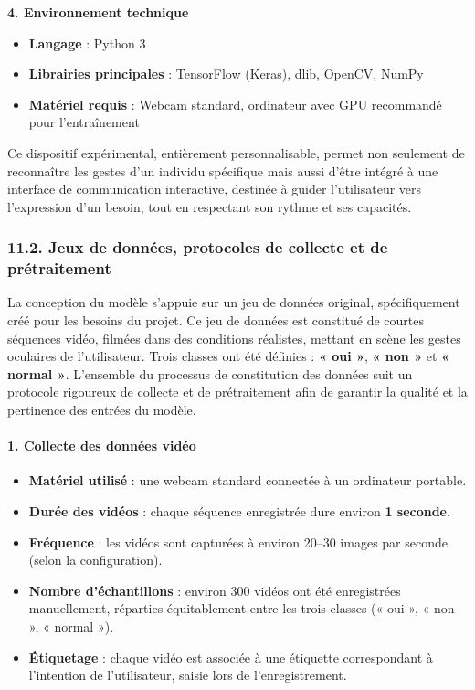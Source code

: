 \documentclass[
]{article}
\begin{document}
\textbf{4. Environnement technique}

\begin{itemize}
\item
  \textbf{Langage} : Python 3
\item
  \textbf{Librairies principales} : TensorFlow (Keras), dlib, OpenCV, NumPy
\item
  \textbf{Matériel requis} : Webcam standard, ordinateur avec GPU recommandé pour l'entraînement
\end{itemize}

Ce dispositif expérimental, entièrement personnalisable, permet non seulement de reconnaître les gestes d'un individu spécifique mais aussi d'être intégré à une interface de communication interactive, destinée à guider l'utilisateur vers l'expression d'un besoin, tout en respectant son rythme et ses capacités.

\hypertarget{jeux-de-donnuxe9es-protocoles-de-collecte-et-de-pruxe9traitement}{%
\subsubsection{11.2. Jeux de données, protocoles de collecte et de prétraitement}\label{jeux-de-donnuxe9es-protocoles-de-collecte-et-de-pruxe9traitement}}

La conception du modèle s'appuie sur un jeu de données original, spécifiquement créé pour les besoins du projet. Ce jeu de données est constitué de courtes séquences vidéo, filmées dans des conditions réalistes, mettant en scène les gestes oculaires de l'utilisateur. Trois classes ont été définies : \textbf{« oui »}, \textbf{« non »} et \textbf{« normal »}. L'ensemble du processus de constitution des données suit un protocole rigoureux de collecte et de prétraitement afin de garantir la qualité et la pertinence des entrées du modèle.

\hypertarget{collecte-des-donnuxe9es-viduxe9o}{%
\paragraph{\texorpdfstring{\textbf{1. Collecte des données vidéo}}{1. Collecte des données vidéo}}\label{collecte-des-donnuxe9es-viduxe9o}}

\begin{itemize}
\item
  \textbf{Matériel utilisé} : une webcam standard connectée à un ordinateur portable.
\item
  \textbf{Durée des vidéos} : chaque séquence enregistrée dure environ \textbf{1 seconde}.
\item
  \textbf{Fréquence} : les vidéos sont capturées à environ 20--30 images par seconde (selon la configuration).
\item
  \textbf{Nombre d'échantillons} : environ 300 vidéos ont été enregistrées manuellement, réparties équitablement entre les trois classes (« oui », « non », « normal »).
\item
  \textbf{Étiquetage} : chaque vidéo est associée à une étiquette correspondant à l'intention de l'utilisateur, saisie lors de l'enregistrement.
\end{itemize}
\end{document}
